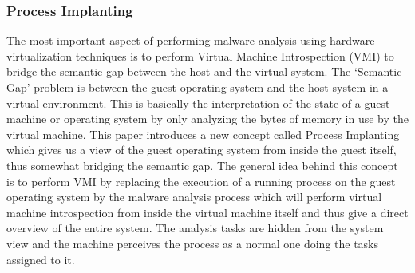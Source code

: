 \documentclass[11pt]{article}
\begin{document}
	\subsubsection{Process Implanting}
	The most important aspect of performing malware analysis using hardware virtualization techniques is to perform Virtual Machine Introspection (VMI) to bridge the semantic gap between the host and the virtual system. The ‘Semantic Gap’ problem is between the guest operating system and the host system in a virtual environment. This is basically the interpretation of the state of a guest machine or operating system by only analyzing the bytes of memory in use by the virtual machine. This paper introduces a new concept called Process Implanting~\cite{jiang2011procimplant} which gives us a view of the guest operating system from inside the guest itself, thus somewhat bridging the semantic gap. The general idea behind this concept is to perform VMI by replacing the execution of a running process on the guest operating system by the malware analysis process which will perform virtual machine introspection from inside the virtual machine itself and thus give a direct overview of the entire system. The analysis tasks are hidden from the system view and the machine perceives the process as a normal one doing the tasks assigned to it.
\end{document}
